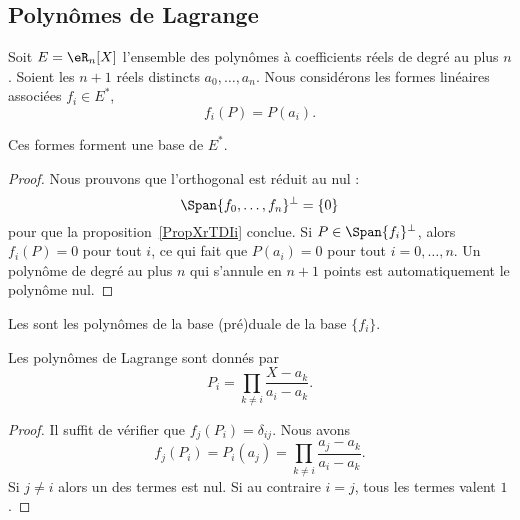 \subsection{Polynômes de Lagrange}

Soit \( E=\eR_n[X]\) l'ensemble des polynômes à coefficients réels de degré au plus \( n\). Soient les \( n+1\) réels distincts \( a_0,\ldots, a_n\). Nous considérons les formes linéaires associées \( f_i\in E^*\),
\begin{equation}
    f_i(P)=P(a_i).
\end{equation}
\begin{lemma}
    Ces formes forment une base de \( E^*\).
\end{lemma}

\begin{proof}
    Nous prouvons que l'orthogonal est réduit au nul :
    \begin{equation}
        \Span\{ f_0,\ldots, f_n \}^{\perp}=\{ 0 \}
    \end{equation}
    pour que la proposition~\ref{PropXrTDIi} conclue. Si \( P\in\Span\{ f_i \}^{\perp}\), alors \( f_i(P)=0\) pour tout \( i\), ce qui fait que \( P(a_i)=0\) pour tout \( i=0,\ldots, n\). Un polynôme de degré au plus \( n\) qui s'annule en \( n+1\) points est automatiquement le polynôme nul.
\end{proof}

Les  sont les polynômes de la base (pré)duale de la base \( \{ f_i \}\).

\begin{proposition}
    Les polynômes de Lagrange sont donnés par
    \begin{equation}
        P_i=\prod_{k\neq i}\frac{ X-a_k }{ a_i-a_k }.
    \end{equation}
\end{proposition}

\begin{proof}
    Il suffit de vérifier que \( f_j(P_i)=\delta_{ij}\). Nous avons
    \begin{equation}
        f_j(P_i)=P_i(a_j)=\prod_{k\neq i}\frac{ a_j-a_k }{ a_i-a_k }.
    \end{equation}
    Si \( j\neq i\) alors un des termes est nul. Si au contraire \( i=j\), tous les termes valent \( 1\).
\end{proof}

